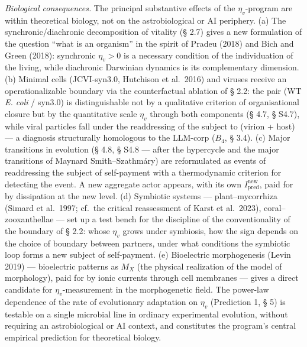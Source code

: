 \documentclass[pdflatex,sn-mathphys-ay]{sn-jnl}
\begin{document}
\emph{Biological consequences.} The principal substantive effects of the \(\eta_v\)-program are within theoretical biology, not on the astrobiological or AI periphery. (a) The synchronic/diachronic decomposition of vitality (§ 2.7) gives a new formulation of the question ``what is an organism'' in the spirit of Pradeu (2018) and Bich and Green (2018): synchronic \(\eta_v > 0\) is a necessary condition of the individuation of the living, while diachronic Darwinian dynamics is its complementary dimension. (b) Minimal cells (JCVI-syn3.0, Hutchison et al.~2016) and viruses receive an operationalizable boundary via the counterfactual ablation of § 2.2: the pair (WT \emph{E. coli} / syn3.0) is distinguishable not by a qualitative criterion of organisational closure but by the quantitative scale \(\eta_v\) through both components (§ 4.7, § S4.7), while viral particles fall under the readdressing of the subject to (virion + host) --- a diagnosis structurally homologous to the LLM-corp (\(B_4\), § 3.4). (c) Major transitions in evolution (§ 4.8, § S4.8 --- after the hypercycle and the major transitions of Maynard Smith--Szathmáry) are reformulated as events of readdressing the subject of self-payment with a thermodynamic criterion for detecting the event. A new aggregate actor appears, with its own \(I_{\text{pred}}^{\text{new}}\), paid for by dissipation at the new level. (d) Symbiotic systems --- plant--mycorrhiza (Simard et al.~1997; cf.~the critical reassessment of Karst et al.~2023), coral--zooxanthellae --- set up a test bench for the discipline of the conventionality of the boundary of § 2.2: whose \(\eta_v\) grows under symbiosis, how the sign depends on the choice of boundary between partners, under what conditions the symbiotic loop forms a new subject of self-payment. (e) Bioelectric morphogenesis (Levin 2019) --- bioelectric patterns as \(M_X\) (the physical realization of the model of morphology), paid for by ionic currents through cell membranes --- gives a direct candidate for \(\eta_v\)-measurement in the morphogenetic field. The power-law dependence of the rate of evolutionary adaptation on \(\eta_v\) (Prediction 1, § 5) is testable on a single microbial line in ordinary experimental evolution, without requiring an astrobiological or AI context, and constitutes the program's central empirical prediction for theoretical biology.
\end{document}
